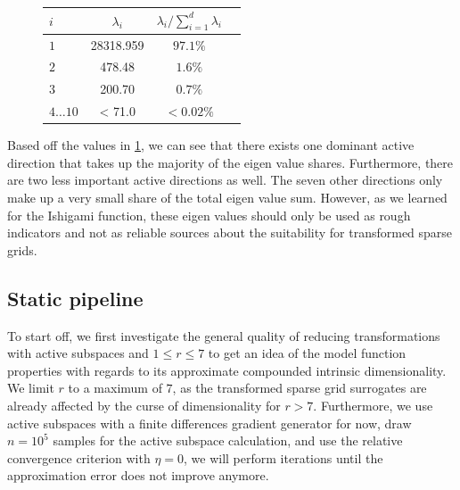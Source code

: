 \documentclass[
  a4paper,  %
  twoside,  %
  bibliography=totoc,
  headsepline,
  cleardoublepage=empty,
  parskip=half,
  draft=false
]{scrbook}
\begin{document}
\begin{mdframed}[style=style]
\begin{figure}[H]
\centering

\bgroup
\def\arraystretch{1.2}%
  \begin{tabular}{ l | c c c}
$i$ & $\lambda_i$ & $\lambda_i / \sum_{i=1}^d \lambda_i$\\
\hline
$1$  & 28318.959 & $97.1\%$\\
$2$   & 478.48 & $1.6\%$\\
$3$  & 200.70 & $0.7\%$\\
$4 \dots 10$  & < 71.0 & $< 0.02\%$\\
\end{tabular}
\egroup
\vspace{0.5em}

\delimit

\label{tab:ww_as}
\end{figure}
\end{mdframed}
%
Based off the values in \cref{tab:ww_as}, we can see that there exists one dominant active direction that takes up the majority of the eigen value shares.
Furthermore, there are two less important active directions as well.
The seven other directions only make up a very small share of the total eigen value sum.
However, as we learned for the Ishigami function, these eigen values should only be used as rough indicators and not as reliable sources about the suitability for transformed sparse grids.

\subsection{Static pipeline}

To start off, we first investigate the general quality of reducing transformations with active subspaces and $1 \leq r \leq 7$ to get an idea of the model function properties with regards to its approximate compounded intrinsic dimensionality.
We limit $r$ to a maximum of $7$, as the transformed sparse grid surrogates are already affected by the curse of dimensionality for $r > 7$.
Furthermore, we use active subspaces with a finite differences gradient generator for now, draw $n=10^5$ samples for the active subspace calculation, and use the relative convergence criterion with $\eta=0$, \ie we will perform iterations until the approximation error does not improve anymore.
\end{document}
